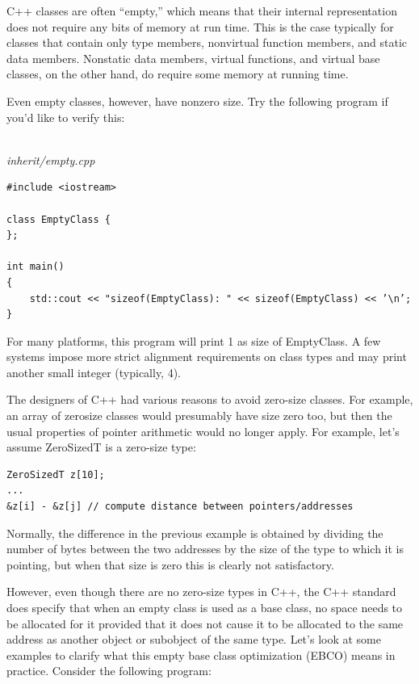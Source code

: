 
C++ classes are often “empty,” which means that their internal representation does not require any bits of memory at run time. This is the case typically for classes that contain only type members, nonvirtual function members, and static data members. Nonstatic data members, virtual functions, and virtual base classes, on the other hand, do require some memory at running time.

Even empty classes, however, have nonzero size. Try the following program if you’d like to verify this:

\hspace*{\fill} \\ %
\noindent
\textit{inherit/empty.cpp}
\begin{lstlisting}[style=styleCXX]
#include <iostream>

class EmptyClass {
};

int main()
{
	std::cout << "sizeof(EmptyClass): " << sizeof(EmptyClass) << ’\n’;
}
\end{lstlisting}

For many platforms, this program will print 1 as size of EmptyClass. A few systems impose more strict alignment requirements on class types and may print another small integer (typically, 4).


The designers of C++ had various reasons to avoid zero-size classes. For example, an array of zerosize classes would presumably have size zero too, but then the usual properties of pointer arithmetic would no longer apply. For example, let’s assume ZeroSizedT is a zero-size type:

\begin{lstlisting}[style=styleCXX]
ZeroSizedT z[10];
...
&z[i] - &z[j] // compute distance between pointers/addresses
\end{lstlisting}

Normally, the difference in the previous example is obtained by dividing the number of bytes between the two addresses by the size of the type to which it is pointing, but when that size is zero this is clearly not satisfactory.

However, even though there are no zero-size types in C++, the C++ standard does specify that when an empty class is used as a base class, no space needs to be allocated for it provided that it does not cause it to be allocated to the same address as another object or subobject of the same type. Let’s look at some examples to clarify what this empty base class optimization (EBCO) means in practice. Consider the following program:

